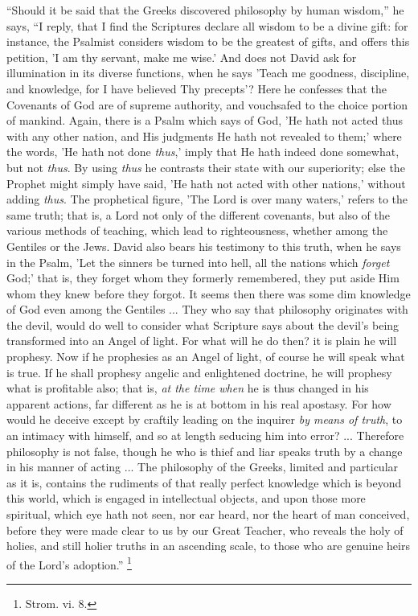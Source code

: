 ``Should it be said that the Greeks discovered philosophy by
human wisdom,'' he says, ``I reply, that I find the Scriptures
declare all wisdom to be a divine gift: for instance, the Psalmist
considers wisdom to be the greatest of gifts, and offers this
petition, 'I am thy servant, make me wise.' And does not David ask for
illumination in its diverse functions, when he says 'Teach me
goodness, discipline, and knowledge, for I have believed Thy
precepts'? Here he confesses that the Covenants of God are of supreme
authority, and vouchsafed to the choice portion of mankind. Again,
there is a Psalm which says of God, 'He hath not acted thus with any
other nation, and His judgments He hath not revealed to them;' where
the words, 'He hath not done \emph{thus},' imply that He hath indeed
done somewhat, but not \emph{thus}. By using \emph{thus} he contrasts
their state with our superiority; else the Prophet might simply have
said, 'He hath not acted with other nations,' without adding \emph{thus}.
The prophetical figure, 'The Lord is over many waters,' refers to the
same truth; that is, a Lord not only of the different covenants, but
also of the various methods of teaching, which lead to righteousness,
whether among the Gentiles or the Jews. David also bears his testimony
to this truth, when he says in the Psalm, 'Let the sinners be turned
into hell, all the nations which \emph{forget} God;' that is, they
forget whom they formerly remembered, they put aside Him whom they
knew before they forgot. It seems then there was some dim knowledge of
God even among the Gentiles ... They who say that philosophy
originates with the devil, would do well to consider what Scripture
says about the devil's being transformed into an Angel of light. For
what will he do then? it is plain he will prophesy. Now if he
prophesies as an Angel of light, of course he will speak what is true.
If he shall prophesy angelic and enlightened doctrine, he will
prophesy what is profitable also; that is, \emph{at the time when} he is thus
changed in his apparent actions, far different as he is at bottom in
his real apostasy. For how would he deceive except by craftily
leading on the inquirer \emph{by means of truth}, to an intimacy with
himself, and so at length seducing him into error? ... Therefore
philosophy is not false, though he who is thief and liar speaks truth
by a change in his manner of acting ... The philosophy of the Greeks,
limited and particular as it is, contains the rudiments of that really
perfect knowledge which is beyond this world, which is engaged in
intellectual objects, and upon those more spiritual, which eye hath
not seen, nor ear heard, nor the heart of man conceived, before they
were made clear to us by our Great Teacher, who reveals the holy of
holies, and still holier truths in an ascending scale, to those who
are genuine heirs of the Lord's adoption.'' \footnote{Strom. vi. 8.}

